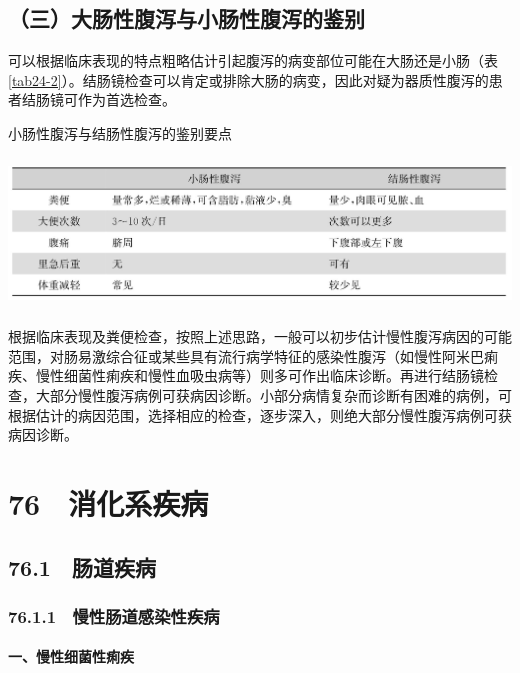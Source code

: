 \subsection{（三）大肠性腹泻与小肠性腹泻的鉴别}

可以根据临床表现的特点粗略估计引起腹泻的病变部位可能在大肠还是小肠（表\ref{tab24-2}）。结肠镜检查可以肯定或排除大肠的病变，因此对疑为器质性腹泻的患者结肠镜可作为首选检查。

\begin{table}[htbp]
\centering
\caption{小肠性腹泻与结肠性腹泻的鉴别要点}
\label{tab24-2}
\includegraphics[width=5.9375in,height=1.57292in]{./images/Image00135.jpg}
\end{table}

根据临床表现及粪便检查，按照上述思路，一般可以初步估计慢性腹泻病因的可能范围，对肠易激综合征或某些具有流行病学特征的感染性腹泻（如慢性阿米巴痢疾、慢性细菌性痢疾和慢性血吸虫病等）则多可作出临床诊断。再进行结肠镜检查，大部分慢性腹泻病例可获病因诊断。小部分病情复杂而诊断有困难的病例，可根据估计的病因范围，选择相应的检查，逐步深入，则绝大部分慢性腹泻病例可获病因诊断。

\protect\hypertarget{text00190.html}{}{}

\section{76　消化系疾病}

\subsection{76.1　肠道疾病}

\subsubsection{76.1.1　慢性肠道感染性疾病}

\paragraph{一、慢性细菌性痢疾}

